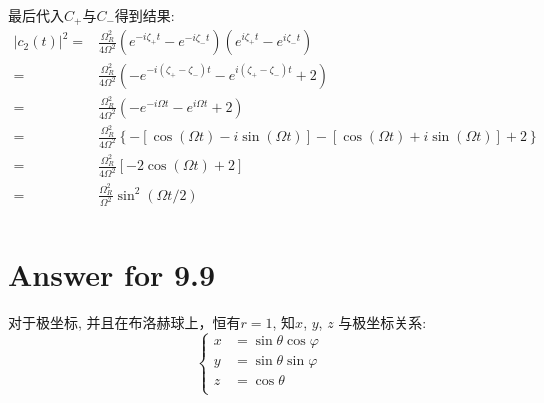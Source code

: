 \documentclass[twoside]{article}
\begin{document}
最后代入$C_+$与$C_-$得到结果:
\begin{equation}
    \begin{split}
        |c_2(t)|^2 = & \frac{\Omega_R^2}{4\Omega^2} \left(e^{-i\zeta_+ t} - e^{-i\zeta_- t}\right) \left(e^{i\zeta_+ t} - e^{i\zeta_- t}\right)                                                                \\
        =            & \frac{\Omega_R^2}{4\Omega^2} \left(- e^{-i\left(\zeta_+ - \zeta_-\right)t} - e^{i\left(\zeta_+ - \zeta_-\right)t} + 2\right)                                                            \\
        =            & \frac{\Omega_R^2}{4\Omega^2} \left(- e^{-i\Omega t} - e^{i\Omega t} + 2\right)                                                                                                          \\
        =            & \frac{\Omega_R^2}{4\Omega^2} \left\{- \left[\cos\left(\Omega t\right)-i\sin\left(\Omega t\right)\right] - \left[\cos\left(\Omega t\right)+i\sin\left(\Omega t\right)\right] + 2\right\} \\
        =            & \frac{\Omega_R^2}{4\Omega^2} \left[-2\cos\left(\Omega t\right) + 2\right]                                                                                                               \\
        =            & \frac{\Omega_R^2}{\Omega^2} \sin^2\left(\Omega t/2\right)                                                                                                                               \\
    \end{split}
\end{equation}


\section*{Answer for 9.9}

对于极坐标, 并且在布洛赫球上，恒有$r = 1$, 知$x$, $y$, $z$ 与极坐标关系:
\begin{equation}
    \begin{cases}
        x & = \sin\theta \cos\varphi \\
        y & = \sin\theta \sin\varphi \\
        z & = \cos\theta             \\
    \end{cases}
\end{equation}
\end{document}
